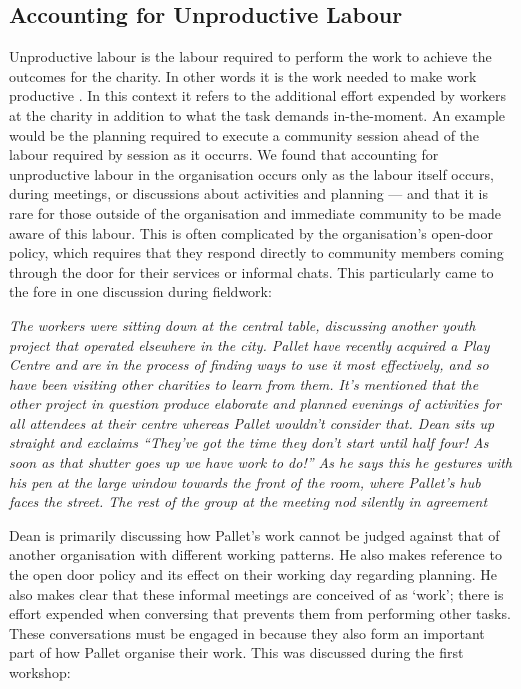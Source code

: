 \subsection{Accounting for Unproductive Labour}
Unproductive labour is the labour required to perform the work to achieve the outcomes for the charity. In other words it is the work needed to make work productive \cite{marx_contribution_1970}. In this context it refers to the additional effort expended by workers at the charity in addition to what the task demands in-the-moment. An example would be the planning required to execute a community session ahead of the labour required by session as it occurrs. We found that accounting for unproductive labour in the organisation occurs only as the labour itself occurs, during meetings, or discussions about activities and planning --- and that it is rare for those outside of the organisation and immediate community to be made aware of this labour. This is often complicated by the organisation's open-door policy, which requires that they respond directly to community members coming through the door for their services or informal chats. This particularly came to the fore in one discussion during fieldwork:

\textit{The workers were sitting down at the central table, discussing another youth project that operated elsewhere in the city. Pallet have recently acquired a Play Centre and are in the process of finding ways to use it most effectively, and so have been visiting other charities to learn from them. It's mentioned that the other project in question produce elaborate and planned evenings of activities for all attendees at their centre whereas Pallet wouldn't consider that. Dean sits up straight and exclaims ``They've got the time they don't start until half four! As soon as that shutter goes up we have work to do!'' As he says this he gestures with his pen at the large window towards the front of the room, where Pallet's hub faces the street. The rest of the group at the meeting nod silently in agreement}

Dean is primarily discussing how Pallet's work cannot be judged against that of another organisation with different working patterns. He also makes reference to the open door policy and its effect on their working day regarding planning. He also makes clear that these informal meetings are conceived of as `work'; there is effort expended when conversing that prevents them from performing other tasks. These conversations must be engaged in because they also form an important part of how Pallet organise their work. This was discussed during the first workshop:

